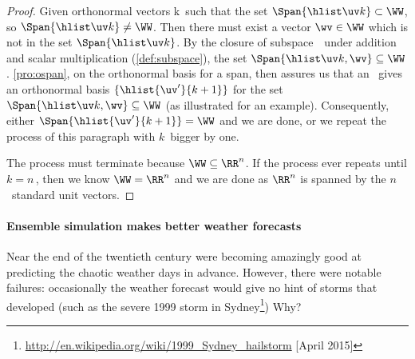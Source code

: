 \begin{proof}
Given orthonormal vectors \hlist\uv k\ such that the set \(\Span\{\hlist\uv k\}\subset\WW\), so \(\Span\{\hlist\uv k\}\neq\WW\).  
Then there must exist a vector \(\wv\in\WW\) which is not in the set \(\Span\{\hlist\uv k\}\).
By the closure of subspace~\WW\ under addition and scalar multiplication (\autoref{def:subspace}), the set \(\Span\{\hlist\uv k,\wv\}\subseteq\WW\).
\autoref{pro:ospan}, on the orthonormal basis for a span, then assures us that an \svd\ gives an orthonormal basis \(\{\hlist{\uv'}{k+1}\}\) for the set \(\Span\{\hlist\uv k,\wv\}\subseteq\WW\) (as illustrated for an example).
Consequently, either \(\Span\{\hlist{\uv'}{k+1}\}=\WW\) and we are done, or we repeat the process of this paragraph with \(k\)~bigger by one.
\begin{center}
\end{center}

The process must terminate because \(\WW\subseteq\RR^n\). 
If the process ever repeats until \(k=n\)\,, then we know \(\WW=\RR^n\) and we are done as \(\RR^n\) is spanned by the \(n\)~standard unit vectors.
\end{proof}





\paragraph{Ensemble simulation makes better weather forecasts}
Near the end of the twentieth century  were becoming amazingly good at predicting the chaotic weather days in advance.
However, there were notable failures: occasionally the weather forecast would give no hint of storms that developed (such as the severe 1999 storm in Sydney\footnote{\url{http://en.wikipedia.org/wiki/1999_Sydney_hailstorm} [April 2015]})
Why?

